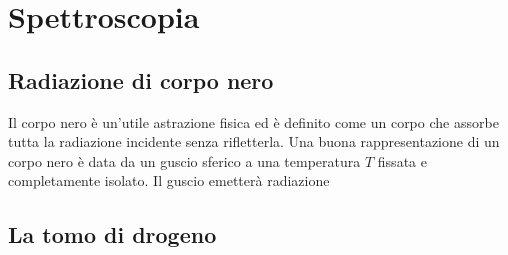 \chapter{Spettroscopia}
\section{Radiazione di corpo nero}
    Il corpo nero è un'utile astrazione fisica ed è definito come un corpo che assorbe tutta la radiazione incidente senza rifletterla. Una buona rappresentazione di un corpo nero è data da un guscio sferico a una temperatura $T$ fissata e completamente isolato. Il guscio emetterà radiazione 
\section{La tomo di drogeno}